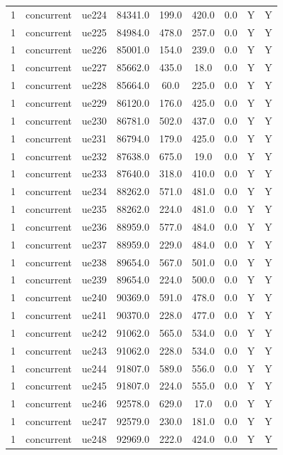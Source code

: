 \begin{table}[ht]
\begin{tabular}{|c|c|c|c|c|c|c|c|c|}
1 & concurrent & ue224 & 84341.0 & 199.0 & 420.0 & 0.0 & Y & Y \\
1 & concurrent & ue225 & 84984.0 & 478.0 & 257.0 & 0.0 & Y & Y \\
1 & concurrent & ue226 & 85001.0 & 154.0 & 239.0 & 0.0 & Y & Y \\
1 & concurrent & ue227 & 85662.0 & 435.0 & 18.0 & 0.0 & Y & Y \\
1 & concurrent & ue228 & 85664.0 & 60.0 & 225.0 & 0.0 & Y & Y \\
1 & concurrent & ue229 & 86120.0 & 176.0 & 425.0 & 0.0 & Y & Y \\
1 & concurrent & ue230 & 86781.0 & 502.0 & 437.0 & 0.0 & Y & Y \\
1 & concurrent & ue231 & 86794.0 & 179.0 & 425.0 & 0.0 & Y & Y \\
1 & concurrent & ue232 & 87638.0 & 675.0 & 19.0 & 0.0 & Y & Y \\
1 & concurrent & ue233 & 87640.0 & 318.0 & 410.0 & 0.0 & Y & Y \\
1 & concurrent & ue234 & 88262.0 & 571.0 & 481.0 & 0.0 & Y & Y \\
1 & concurrent & ue235 & 88262.0 & 224.0 & 481.0 & 0.0 & Y & Y \\
1 & concurrent & ue236 & 88959.0 & 577.0 & 484.0 & 0.0 & Y & Y \\
1 & concurrent & ue237 & 88959.0 & 229.0 & 484.0 & 0.0 & Y & Y \\
1 & concurrent & ue238 & 89654.0 & 567.0 & 501.0 & 0.0 & Y & Y \\
1 & concurrent & ue239 & 89654.0 & 224.0 & 500.0 & 0.0 & Y & Y \\
1 & concurrent & ue240 & 90369.0 & 591.0 & 478.0 & 0.0 & Y & Y \\
1 & concurrent & ue241 & 90370.0 & 228.0 & 477.0 & 0.0 & Y & Y \\
1 & concurrent & ue242 & 91062.0 & 565.0 & 534.0 & 0.0 & Y & Y \\
1 & concurrent & ue243 & 91062.0 & 228.0 & 534.0 & 0.0 & Y & Y \\
1 & concurrent & ue244 & 91807.0 & 589.0 & 556.0 & 0.0 & Y & Y \\
1 & concurrent & ue245 & 91807.0 & 224.0 & 555.0 & 0.0 & Y & Y \\
1 & concurrent & ue246 & 92578.0 & 629.0 & 17.0 & 0.0 & Y & Y \\
1 & concurrent & ue247 & 92579.0 & 230.0 & 181.0 & 0.0 & Y & Y \\
1 & concurrent & ue248 & 92969.0 & 222.0 & 424.0 & 0.0 & Y & Y \\

\end{tabular}
\end{table}
